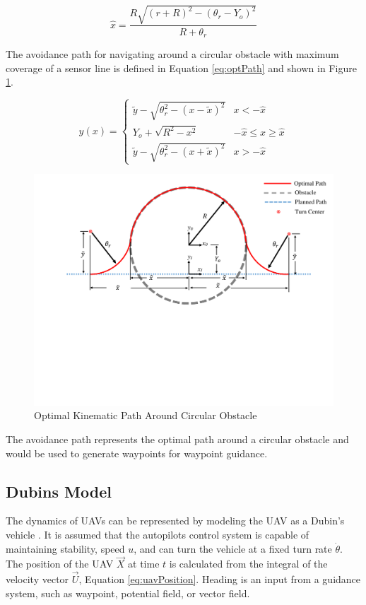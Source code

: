 \documentclass[conf]{new-aiaa}
\begin{document}
\begin{equation}
\label{eq:optPathXhat}
\hat{x} = \frac{R\sqrt{(r+R)^2-(\theta_r-Y_o)^2}}{R+\theta_r}
\end{equation}

The avoidance path for navigating around a circular obstacle with maximum coverage of a sensor line is defined in Equation \ref{eq:optPath} and shown in Figure \ref{fig:optimalpath}.


\begin{equation}
\label{eq:optPath}
y(x) = \left\{
\begin{array}{ll}
\widetilde{y} -\sqrt{\theta_r^2 - (x-\widetilde{x})^2} &  x < -\hat{x} \\
Y_o +\sqrt{R^2 - x^2} & -\hat{x} \leq x \geq \hat{x}\\
\widetilde{y} -\sqrt{\theta_r^2 - (x+\widetilde{x})^2}&  x > -\hat{x}
\end{array}
\right.
\end{equation}

\begin{figure}[H]
	\centering
	\includegraphics[width=0.7\linewidth ,trim=0 265 0 20,clip,width=15cm]{Figures/optimalPath/optimalPath}
	\caption{Optimal Kinematic Path Around Circular Obstacle}
	\label{fig:optimalpath}
\end{figure}

The avoidance path represents the optimal path around a circular obstacle and would be used to generate waypoints for waypoint guidance.

\subsection{Dubins Model}
The dynamics of UAVs can be represented by modeling the UAV as a Dubin's vehicle \cite{frew_cooperative_2007,griffiths_vector_2006,nelson_cooperative_2005,nelson_vector_2006,nelson_vector_2007}. It is assumed that the autopilots control system is capable of maintaining stability, speed $u$, and can turn the vehicle at a fixed turn rate $\dot{\theta}$. The position of the UAV $\overrightarrow{X}$ at time $t$ is calculated from the integral of the velocity vector $\overrightarrow{U}$, Equation \ref{eq:uavPosition}. Heading is an input from a guidance system, such as waypoint, potential field, or vector field.
\end{document}
